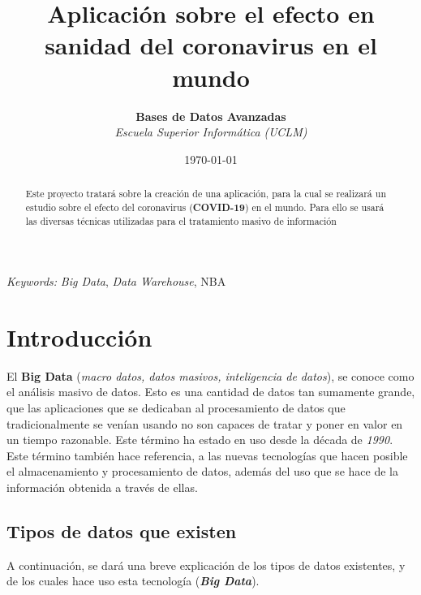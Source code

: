 \documentclass[11pt]{diazessay} %
\title{\textbf{Aplicación sobre el efecto en sanidad del coronavirus en el mundo}} %
\author{\textbf{Bases de Datos Avanzadas} \\ \textit{Escuela Superior Informática (UCLM)}} %
\date{\today} %
\begin{document}
\maketitle %



\begin{abstract}
	
	Este proyecto tratará sobre la creación de una aplicación, para la cual se realizará un estudio sobre el efecto del coronavirus (\textbf{COVID-19}) en el mundo. Para ello se usará las diversas técnicas utilizadas para el tratamiento masivo de información

\end{abstract}

\hspace*{3.6mm}\textit{Keywords:} \textit{Big Data}, \textit{Data Warehouse}, NBA

\vspace{20pt} %


\section*{Introducción}
El \textbf{Big Data} (\textit{macro datos, datos masivos, inteligencia de datos}), se conoce como el análisis masivo de datos. Esto es una cantidad de datos tan sumamente grande, que las aplicaciones que se dedicaban al  procesamiento de datos que tradicionalmente se venían usando no son capaces de tratar y poner en valor en un tiempo razonable. Este  término ha estado en uso desde la década de \textit{1990}.\\
Este término también hace referencia, a las nuevas tecnologías que hacen posible el almacenamiento y procesamiento de datos, además del uso que se hace de la información obtenida a través de ellas.\\

\subsection*{Tipos de datos que existen}
A continuación, se dará una breve explicación de los tipos de datos existentes, y de los cuales hace uso esta tecnología (\textbf{\textit{Big Data}}).
\end{document}
